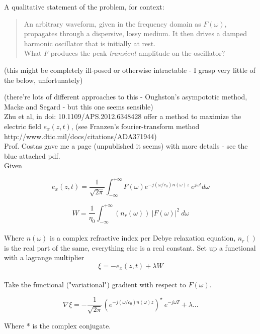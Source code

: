 \documentclass[]{article}
\begin{document}
A qualitative statement of the problem, for context:

\begin{quote}
An arbitrary waveform, given in the frequency domain as $F(\omega)$, propagates through a dispersive, lossy medium. It then drives a damped harmonic oscillator that is initially at rest. \\

What $F$ produces the peak {\it transient} amplitude on the oscillator?

\end{quote}

(this might be completely ill-posed or otherwise intractable - I grasp very little of the below, unfortunately)

(there're lots of different approaches to this - Oughston's asympototic method, Macke and Segard - but this one seems sensible) \\

Zhu et al, in doi: 10.1109/APS.2012.6348428 offer a method to maximize the electric field $e_x(z,t)$, (see Franzen's fourier-transform method \\ http://www.dtic.mil/docs/citations/ADA371944)\\

Prof. Costas gave me a page (unpublished it seems) with more details - see the blue attached pdf.\\

Given

$$ e_x(z,t) = \frac{1}{\sqrt{2 \pi}} \int_{-\infty}^{+\infty}{F(\omega) e^{- j (\omega/c_0)n(\omega)z}\ e^{j\omega t} d\omega} $$

$$W = \frac{1}{\eta_0} \int_{-\infty}^{+\infty}{(n_r(\omega))\ |F(\omega)|^2}\ d\omega$$\\

Where $n(\omega)$ is a complex refractive index per Debye relaxation equation, $n_r()$ is the real part of the same, everything else is a real constant. Set up a functional with a lagrange multiplier\\

$$\xi = -e_x(z,t) + \lambda W$$\\

Take the functional ("variational") gradient with respect to $F(\omega)$.

$$ \nabla \xi = -\frac{1}{\sqrt{2\pi}} \left(e^{- j (\omega/c_0)n(\omega)z}\right)^\star \  e^{-j\omega T} + \lambda...$$

Where * is the complex conjugate.\\
\end{document}
